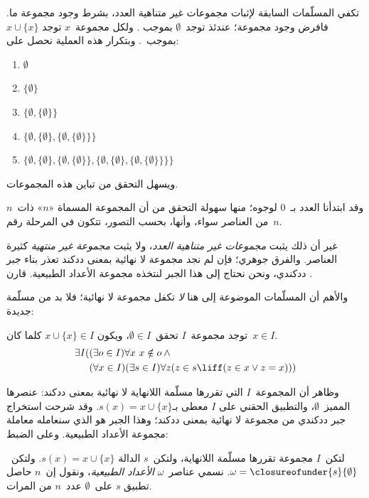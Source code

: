 \documentclass[../../../include/open-logic-section]{subfiles}
\begin{document}

تكفي المسلّمات السابقة لإثبات مجموعات غير متناهية العدد، بشرط وجود
مجموعة ما. فافرض وجود مجموعة؛ عندئذ توجد~$\emptyset$ بموجب
. ولكل مجموعة~$x$ توجد
$x \cup \{x\}$ بموجب~.
وبتكرار هذه العملية نحصل على:
\begin{enumerate}
	\item[0.] $\emptyset$ %
	\item[1.] $ \{\emptyset\}$ %
	\item[2.] $\{\emptyset, \{\emptyset\}\}$ %
	\item[3.] $\{\emptyset, \{\emptyset\}, \{\emptyset, \{\emptyset\}\}\}$ %
	\item[4.] $\{\emptyset, \{\emptyset\}, \{\emptyset, \{\emptyset\}\}, \{\emptyset, \{\emptyset\}, \{\emptyset, \{\emptyset\}\}\}\}$%
\end{enumerate}
ويسهل التحقق من تباين هذه المجموعات.

وقد ابتدأنا العدد بـ~$0$ لوجوه؛ منها سهولة التحقق من أن المجموعة
المسماة «$n$» ذات~$n$ من العناصر سواء، وأنها، بحسب التصور، تتكون في
المرحلة رقم~$n$.

غير أن ذلك يثبت \emph{مجموعات غير متناهية العدد}، ولا يثبت
\emph{مجموعة غير منتهية} كثيرة العناصر. والفرق جوهري؛ فإن لم نجد
مجموعة لا نهائية بمعنى ددكند تعذر بناء جبر ددكندي، ونحن نحتاج إلى هذا
الجبر لنتخذه مجموعة الأعداد الطبيعية. قارن
.

والأهم أن المسلّمات الموضوعة إلى هنا \emph{لا} تكفل مجموعة لا نهائية؛
فلا بد من مسلّمة جديدة:

\begin{axiom}[اللانهاية]
توجد مجموعة~$I$ تحقق~$\emptyset \in I$، ويكون
$x \cup \{x\} \in I$ كلما كان~$x \in I$.
\begin{align*}
	\exists I( & (\exists o \in I)\forall x\ x \notin o \land {}\\
	& (\forall x \in I)(\exists s \in I)\forall z(z \in s \liff (z \in x \lor z = x)))
\end{align*}
\end{axiom}

وظاهر أن المجموعة~$I$ التي تقررها مسلّمة اللانهاية لا نهائية بمعنى
ددكند: عنصرها المميز~$\emptyset$، والتطبيق الحقني على
$I$ معطى بـ$s(x) = x\cup\{x\}$. وقد شرحت
 استخراج
جبر ددكندي من مجموعة لا نهائية بمعنى ددكند؛ وهذا الجبر هو الذي سنعامله
معاملة مجموعة الأعداد الطبيعية. وعلى الضبط:
\begin{defn}
لتكن~$I$ مجموعة تقررها مسلّمة اللانهاية، ولتكن~$s$ الدالة
$s(x) = x \cup \{x\}$. ولتكن~$\omega = \closureofunder{s}{\emptyset}$.
نسمي عناصر~$\omega$ \emph{الأعداد الطبيعية}، ونقول إن~$n$ حاصل تطبيق
$s$ على~$\emptyset$ عدد~$n$ من المرات.
\end{defn}
\end{document}
